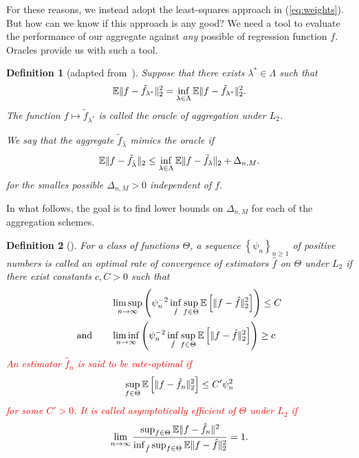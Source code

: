 \documentclass[12pt, letter paper]{article}
\newcommand{\1}{\mathmybb{1}}
\newtheorem{definition}{Definition}[section]
\newcommand{\0}{\emptyset}
\newcommand{\E}{\mathbb{E}}
\newcommand{\Ep}[1]{\mathbb{E}\left[ #1 \right]}
\newcommand{\paren}[1]{\left(#1 \right)}
\newcommand{\set}[1]{\left\{ #1 \right\}}
\newcommand{\norm}[1]{|\hspace{-1pt}|#1 |\hspace{-1pt}|}
\newcommand{\normsq}[1]{\norm{#1}^{2}}
\newcommand{\ftilde}[1]{\tilde{f}_{#1}}
\newcommand{\lambdahat}[1]{\hat{\lambda}_{#1}}
\begin{document}
For these reasons, we instead adopt the least-squares approach in (\ref{eq:weights}). But how can we know if this approach is any good? We need a tool to evaluate the performance of our aggregate against \emph{any} possible of regression function \(f\). Oracles provide us with such a tool. 

\begin{definition}[adapted from~\cite{tsybakov_introduction_2009}]
    Suppose that there exists \(\lambda^{*}\in\Lambda\) such that 
    \[\E\normsq{f-\ftilde{\lambda^{*}}}_{2} = \inf_{\lambda\in\Lambda}\E\normsq{f-\ftilde{\lambda^{*}}}_{2}.\]
    The function \(f\mapsto \ftilde{\lambda^{*}}\) is called the oracle of aggregation under \(L_{2}\).

    We say that the aggregate \(\ftilde{\lambdahat{}}\) {mimics} the oracle if
    \begin{equation}\label{eq:oracleineq}
        \E\norm{f - \ftilde{\lambdahat{}}}_{2} \leq \inf_{\lambda\in\Lambda}\E\norm{f - \ftilde{\lambda}}_{2} + \Delta_{n,M}.
    \end{equation}
    for the smalles possible \(\Delta_{n,M}>0\) independent of \(f\).
\end{definition}

In what follows, the goal is to find lower bounds on \(\Delta_{n,M}\) for each of the aggregation schemes. 

\begin{definition}[\cite{tsybakov_introduction_2009}]
    For a class of functions \(\Theta\), a sequence \(\set{\psi_{n}}_{n\geq1}\) of positive numbers is called an \emph{optimal rate of convergence} of estimators \(\hat{f}\) on \(\Theta\) under \(L_{2}\) if there exist constants \(c, C>0\) such that
    \begin{align}
        &\limsup_{n\to\infty}\paren{\psi_{n}^{-2}\inf_{\hat{f}}\sup_{f\in\Theta}\Ep{\norm{f - \hat{f}}_{2}^{2}}}\leq C\\
        \text{and}\qquad&\liminf_{n\to\infty}\paren{\psi_{n}^{-2}\inf_{\hat{f}}\sup_{f\in\Theta}\Ep{\norm{f - \hat{f}}_{2}^{2}}}\geq c
    \end{align}
    \textcolor{red}{An estimator \(\hat{f}_{n}\) is said to be \emph{rate-optimal} if 
    \[\sup_{f\in\Theta}\Ep{\norm{f - \hat{f}_{n}}_{2}^{2}} \leq C'\psi_{n}^{2}\]
    for some \(C'>0\). It is called \emph{asymptotically efficient} of \(\Theta\) under \(L_{2}\) if 
    \[\lim_{n\to\infty}\frac{\sup_{f\in\Theta}\E{\normsq{f-\hat{f}_{n}}}}{\inf_{\hat{f}}\sup_{f\in\Theta}\E{\norm{f - \hat{f}}_{2}^{2}}}=1.\]}
\end{definition}
\end{document}
